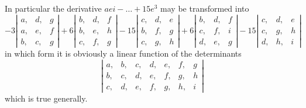 \documentclass[11pt,a4paper]{article}
\theoremstyle{plain}
\theoremstyle{definition}
\theoremstyle{remark}
\begin{document}
In particular the derivative $aei - \ldots + 15e^3$ may be transformed into
\[
-3\left|\begin{array}{ccc}
a, & d, & g \\
a, & e, & f \\
b, & c, & g
\end{array}\right|
+ 6
\left|\begin{array}{ccc}
b, & d, & f \\
b, & e, & h \\
c, & f, & g
\end{array}\right|
- 15
\left|\begin{array}{ccc}
c, & d, & e \\
b, & f, & g \\
c, & g, & h
\end{array}\right|
+ 6
\left|\begin{array}{ccc}
b, & d, & f \\
c, & f, & i \\
d, & e, & g
\end{array}\right|
- 15
\left|\begin{array}{ccc}
c, & d, & e \\
c, & g, & h \\
d, & h, & i
\end{array}\right|
\]
in which form it is obviously a linear function of the determinants
\[
\left|\begin{array}{ccccccc}
a, & b, & c, & d, & e, & f, & g \\
b, & c, & d, & e, & f, & g, & h \\
c, & d, & e, & f, & g, & h, & i
\end{array}\right|
\]
which is true generally.
\end{document}

